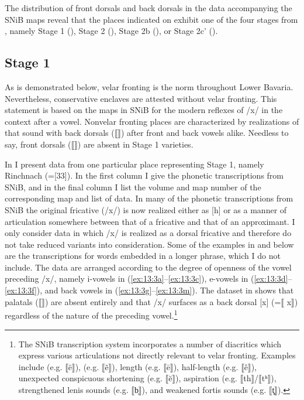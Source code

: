 The distribution of front dorsals and back dorsals in the data accompanying the SNiB maps reveal that the places indicated on  exhibit one of the four stages from , namely Stage 1 (), Stage 2 (), Stage 2b (), or Stage 2c{}' ().

\subsection{Stage 1}\label{sec:13.3.1}
\begin{sloppypar}
As is demonstrated below, velar fronting is the norm throughout Lower Bavaria. Nevertheless, conservative enclaves are attested without velar fronting. This statement is based on the maps in SNiB for the modern reflexes of  /x/ in the context after a vowel. Nonvelar fronting places are characterized by realizations of that sound with back dorsals (⟦⟧) after front and back vowels alike. Needless to say, front dorsals (⟦⟧) are absent in Stage 1 varieties.
\end{sloppypar}

In  I present data from one particular place representing Stage 1, namely Rinchnach (=[33]). In the first column I give the phonetic transcriptions from SNiB, and in the final column I list the volume and map number of the corresponding map and list of data. In many of the phonetic transcriptions from SNiB the original fricative (/x/) is now realized either as [h] or as a manner of articulation somewhere between that of a fricative and that of an approximant. I only consider data in which  /x/ is realized as a dorsal fricative and therefore do not take reduced variants into consideration. Some of the examples in  and below are the transcriptions for words embedded in a longer phrase, which I do not include. The data are arranged according to the degree of openness of the vowel preceding /x/, namely i-vowels in (\ref{ex:13:3a}--\ref{ex:13:3c}), e-vowels in (\ref{ex:13:3d}--\ref{ex:13:3f}), and back vowels in (\ref{ex:13:3g}--\ref{ex:13:3m}). The dataset in  shows that palatals (⟦⟧) are absent entirely and that  /x/ surfaces as a back dorsal [x] (=⟦ x⟧) regardless of the nature of the preceding vowel.\footnote{{The SNiB transcription system incorporates a number of diacritics which express various articulations not directly relevant to velar fronting. Examples include  (e.g. ⟦ë⟧),  (e.g. ⟦ẽ⟧), length (e.g. ⟦ē⟧), half-length (e.g. ⟦ê⟧), unexpected conspicuous shortening (e.g. ⟦ĕ⟧), aspiration (e.g. ⟦th⟧/⟦t}\textrm{ʰ}\textrm{⟧), strengthened lenis sounds (e.g. ⟦b̩⟧), and weakened fortis sounds (e.g. ⟦t͓⟧).}}


